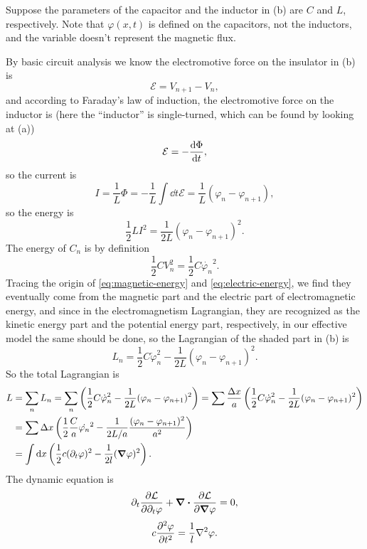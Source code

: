 \documentclass[hyperref, a4paper]{article}
\begin{document}
\begin{itemize}
Suppose the parameters of the capacitor and the inductor in (b)
are $C$ and $L$, respectively.
Note that $\varphi(x, t)$ is defined on the capacitors, not the inductors,
and the variable doesn't represent the magnetic flux.

By basic circuit analysis we know 
the electromotive force on the insulator in (b) is
\[
    \mathcal{E} = V_{n+1} - V_{n},
\]
and according to Faraday's law of induction, the electromotive force on the inductor is 
(here the ``inductor'' is single-turned, which can be found by looking at (a))
\[
    \mathcal{E} = - \dv{\Phi}{t},
\]
so the current is 
\[
    I = \frac{1}{L} \Phi = - \frac{1}{L} \int \dd{t} \mathcal{E} = \frac{1}{L} (\varphi_n - \varphi_{n+1}) ,
\]
so the energy is 
\begin{equation}
    \frac{1}{2} L I^2 = \frac{1}{2L} (\varphi_n - \varphi_{n+1})^2.
    \label{eq:magnetic-energy}
\end{equation}
The energy of $C_n$ is by definition
\begin{equation}
    \frac{1}{2} C V_n^2 = \frac{1}{2} C \dot{\varphi_n}^2.
    \label{eq:electric-energy}
\end{equation}
Tracing the origin of \eqref{eq:magnetic-energy} and \eqref{eq:electric-energy},
we find they eventually come from the magnetic part and the electric part of electromagnetic energy,
and since in the electromagnetism Lagrangian,
they are recognized as the kinetic energy part and the potential energy part, respectively,
in our effective model the same should be done, 
so the Lagrangian of the shaded part in (b) is
\begin{equation}
    L_{n} = \frac{1}{2} C \dot{\varphi}_n^2 - \frac{1}{2 L} (\varphi_n - \varphi_{n+1})^2.
\end{equation}
So the total Lagrangian is 
\begin{equation}
    \begin{aligned}
        L &= \sum_n L_n = 
        \sum_n \left( \frac{1}{2} C \dot{\varphi}_n^2 - \frac{1}{2 L} (\varphi_n - \varphi_{n+1})^2 \right) 
        = \sum \frac{\Delta{x}}{a} 
        \left( \frac{1}{2} C \dot{\varphi}_n^2 - \frac{1}{2 L} (\varphi_n - \varphi_{n+1})^2 \right) \\
        &= \sum \Delta{x} \left(
            \frac{1}{2} \frac{C}{a} \dot{\varphi_n}^2 
            - \frac{1}{2 L / a} 
            \frac{(\varphi_n - \varphi_{n+1})^2}{a^2}  
        \right) \\
        &= \int \dd{x} \left(
            \frac{1}{2} c (\partial_t \varphi)^2 - \frac{1}{2 l} (\grad{\varphi})^2
        \right).
    \end{aligned}
\end{equation}
The dynamic equation is 
\[
    \partial_t \pdv{\mathcal{L}}{\partial_t \varphi} + \div \pdv{\mathcal{L}}{\grad{\varphi}} = 0,
\]
\begin{equation}
    c \pdv[2]{\varphi}{t} = \frac{1}{l} \laplacian \varphi.
    \label{eq:telegraph-eq}
\end{equation}


\end{itemize}
\end{document}
